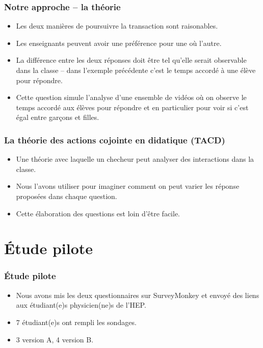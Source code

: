 \documentclass{beamer}
\begin{document}
\begin{frame}
\frametitle{Notre approche -- la théorie}
\begin{itemize}
\item Les deux manières de poursuivre la transaction sont raisonables.
\item Les enseignants peuvent avoir une préférence pour une où l'autre.
\item La différence entre les deux réponses doit être tel qu'elle serait
  observable dans la classe -- dans l'exemple précédente c'est le temps
  accordé à une élève pour répondre.
\item Cette question simule l'analyse d'une ensemble de vidéos où on
  observe le temps accordé aux élèves pour répondre et en particulier
  pour voir si c'est égal entre garçons et filles.
\end{itemize}
\end{frame}

\begin{frame}
  \frametitle{La théorie des actions cojointe en didatique (TACD)}
  \begin{itemize}
    \item Une théorie avec laquelle un checheur peut analyser des interactions
      dans la classe.
    \item Nous l'avons utiliser pour imaginer comment on peut varier
      les réponse proposées dans chaque question.
      \item Cette élaboration des questions est loin d'être facile.
    \end{itemize}
\end{frame}

\section{Étude pilote}
\begin{frame}
\frametitle{Étude pilote}
  \begin{itemize}
  \item Nous avons mis les deux questionnaires sur SurveyMonkey et envoyé des liens aux étudiant(e)s
  physicien(ne)s de l'HEP.
  \item 7 étudiant(e)s ont rempli les sondages.
    \item 3 version A, 4 version B.
    \end{itemize}

\end{frame}
\end{document}
